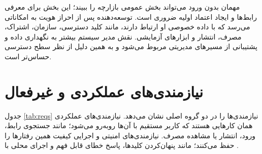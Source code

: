 مهمان بدون ورود می‌تواند بخش عمومی بازارچه را ببیند؛ این بخش برای معرفی رابط‌ها و ایجاد اعتماد اولیه ضروری است. توسعه‌دهنده پس از احراز هویت به امکاناتی می‌رسد که با داده خصوصی او ارتباط دارند، مانند کلید دسترسی، سازمان، اشتراک، مصرف، انتشار و ابزارهای آزمایشی. نقش مدیر سیستم بیشتر به نگهداری داده و پشتیبانی از مسیرهای مدیریتی مربوط می‌شود و به همین دلیل از نظر سطح دسترسی حساس‌تر است.

\section{نیازمندی‌های عملکردی و غیرفعال}
جدول \ref{tab:reqs} نیازمندی‌ها را در دو گروه اصلی نشان می‌دهد. نیازمندی‌های عملکردی همان کارهایی هستند که کاربر مستقیم با آن‌ها روبه‌رو می‌شود؛ مانند جستجوی رابط، ورود، انتشار یا مشاهده مصرف. نیازمندی‌های امنیتی و اجرایی کیفیت همین رفتارها را حفظ می‌کنند؛ مانند پنهان‌کردن کلیدها، پاسخ خطای قابل فهم و اجرای محلی با .

